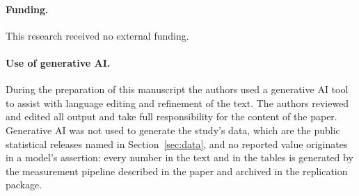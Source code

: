 \paragraph{Funding.} This research received no external funding.
\fi

\paragraph{Use of generative AI.} During the preparation of this manuscript the authors used a
generative AI tool to assist with language editing and refinement of the text. The authors
reviewed and edited all output and take full responsibility for the content of the paper.
Generative AI was not used to generate the study's data, which are the public statistical
releases named in Section~\ref{sec:data}, and no reported value originates in a model's
assertion: every number in the text and in the tables is generated by the measurement pipeline
described in the paper and archived in the replication package.
